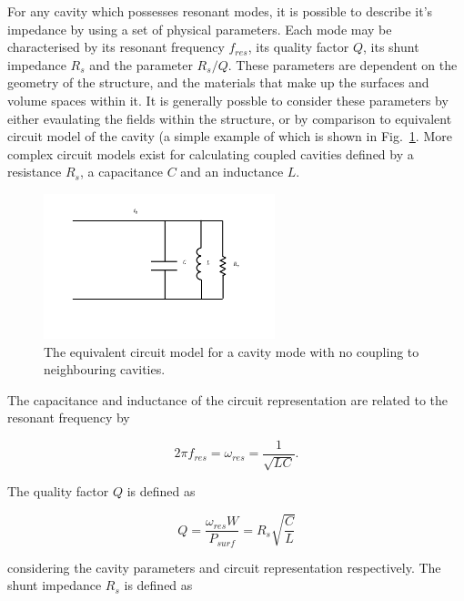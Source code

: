 \label{app:ferrProp}

For any cavity which possesses resonant modes, it is possible to describe it's impedance by using a set of physical parameters. Each mode may be characterised by its resonant frequency $f_{res}$, its quality factor $Q$, its shunt impedance $R_{s}$ and the parameter $R_{s}/Q$. These parameters are dependent on the geometry of the structure, and the materials that make up the surfaces and volume spaces within it. It is generally possble to consider these parameters by either evaulating the fields within the structure, or by comparison to equivalent circuit model of the cavity (a simple example of which is shown in Fig.~\ref{fig:cavCircuitModel}. More complex circuit models exist for calculating coupled cavities \cite{Knapp:CoupledResModel} defined by a resistance $R_{s}$, a capacitance $C$ and an inductance $L$.

\begin{figure}
\begin{center}
\includegraphics[width=0.6\textwidth]{appendices/figures/equiv-circuit.pdf}
\end{center}
\caption{The equivalent circuit model for a cavity mode with no coupling to neighbouring cavities.}
\label{fig:cavCircuitModel}
\end{figure}

The capacitance and inductance of the circuit representation are related to the resonant frequency by

\begin{equation}
2\pi f_{res} = \omega_{res} = \frac{1}{\sqrt{LC}}.
\end{equation}

The quality factor $Q$ is defined as

\begin{equation}
Q = \frac{\omega_{res}W}{P_{surf}} = R_{s}\sqrt{\frac{C}{L}}
\end{equation}

considering the cavity parameters and circuit representation respectively. The shunt impedance $R_{s}$ is defined as

